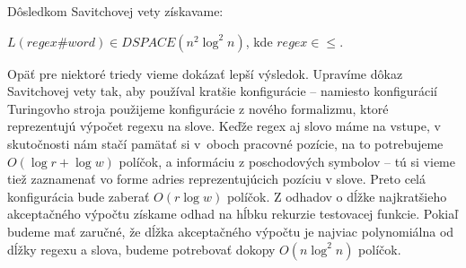 Dôsledkom Savitchovej vety získavame:
\begin{veta}
$L(regex\#word) \in DSPACE(n^2 \log^2 n)$, kde $regex \in \le$. 
\end{veta}

Opäť pre niektoré triedy vieme dokázať lepší výsledok. Upravíme dôkaz Savitchovej vety tak, aby používal kratšie konfigurácie -- namiesto konfigurácií Turingovho stroja použijeme konfigurácie z nového formalizmu, ktoré reprezentujú výpočet regexu na slove. Keďže regex aj slovo máme na vstupe, v skutočnosti nám stačí pamätať si v~oboch pracovné pozície, na to potrebujeme $O(\log r + \log w)$ políčok, a informáciu z poschodových symbolov -- tú si vieme tiež zaznamenať vo forme adries reprezentujúcich pozíciu v slove. Preto celá konfigurácia bude zaberať $O(r\log w)$ políčok. Z odhadov o dĺžke najkratšieho akceptačného výpočtu získame odhad na hĺbku rekurzie testovacej funkcie. Pokiaľ budeme mať zaručné, že dĺžka akceptačného výpočtu je najviac polynomiálna od dĺžky regexu a slova, budeme potrebovať dokopy $O(n\log^2 n)$ políčok.

